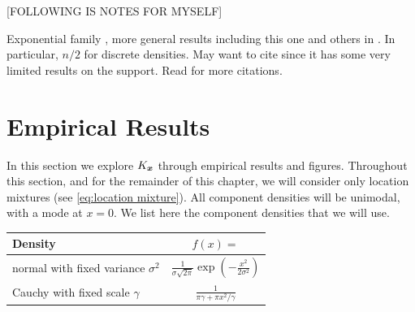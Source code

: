 	[FOLLOWING IS NOTES FOR MYSELF]

	Exponential family \cite{Lindsay1983a-he}, more general results including this one and others in \cite{Lindsay1993-rj}. In particular, $n/2$ for discrete densities. May want to cite \cite{Seregin2010-xe} since it has some very limited results on the support. Read \cite{Zhang2008-wn} for more citations.
	




\section{Empirical Results}
\label{sec:empirical results}
	In this section we explore $K_{\bm{{x}}}$ through empirical results and figures. Throughout this section, and for the remainder of this chapter, we will consider only location mixtures (see \eqref{eq:location mixture}). All component densities will be unimodal, with a mode at $x = 0$. We list here the component densities that we will use.

	\begin{tabular}{l | c}
		Density & $f(x) = $\\
		\hline
		normal with fixed variance $\sigma^2$ & $\frac{1}{\sigma \sqrt{2 \pi}} \exp\left(-\frac{x^2}{2\sigma^2}\right) $\\
		Cauchy with fixed scale $\gamma$ & $\frac{1}{\pi \gamma + \pi x^2/\gamma}$
	\end{tabular}

